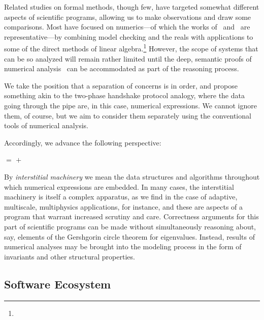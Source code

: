 \documentclass[12pt]{article}
\begin{document}
Related studies on formal methods, though few, have targeted somewhat
different aspects of scientific programs, allowing us to make
observations and draw some comparisons.  Most have focused on
numerics---of which the works of~\cite{bientinesi2005} and~\cite{siegel2008} are
representative---by combining model checking and the reals with
applications to some of the direct methods of linear
algebra.\footnote{\direct} However, the scope of systems that can be
so analyzed will remain rather limited until the deep, semantic proofs
of numerical analysis~\citep{linz1988} can be accommodated as part of
the reasoning process.

We take the position that a separation of concerns is in order, and
propose something akin to the two-phase handshake protocol
analogy, where the data going through the pipe are, in this case,
numerical expressions.  We cannot ignore them, of course, but we aim
to consider them separately using the conventional tools of numerical
analysis.

Accordingly, we advance the following perspective:
\begin{center}
  $\bm{=}$ 
  $\bm{+}$ 
\end{center}
By \emph{interstitial machinery} we mean the data structures and
algorithms throughout which numerical expressions are embedded.  In
many cases, the interstitial machinery is itself a complex apparatus,
as we find in the case of adaptive, multiscale, multiphysics
applications, for instance, and these are aspects of a program that
warrant increased scrutiny and care.  Correctness arguments for this
part of scientific programs can be made without simultaneously
reasoning about, say, elements of the Gershgorin circle theorem for
eigenvalues.  Instead, results of numerical analyses may be brought
into the modeling process in the form of invariants and other
structural properties.

\subsection{Software Ecosystem}
\end{document}
